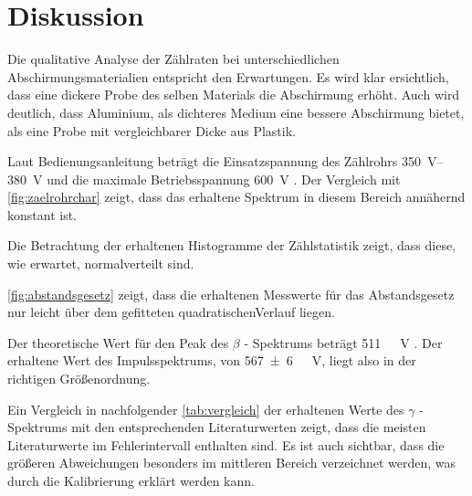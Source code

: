 \documentclass[12pt,english,ngerman]{scrartcl}
\begin{document}
\section*{Diskussion}\label{sec:diskussion}

Die qualitative Analyse der Zählraten bei unterschiedlichen Abschirmungsmaterialien entspricht den Erwartungen.
Es wird klar ersichtlich, dass eine dickere Probe des selben Materials die Abschirmung erhöht. Auch wird deutlich,
dass Aluminium, als dichteres Medium eine bessere Abschirmung bietet, als eine Probe mit vergleichbarer Dicke aus Plastik.

Laut Bedienungsanleitung beträgt die Einsatzspannung des Zählrohrs \SIrange{350}{380}{\volt} und die maximale Betriebsspannung
\SI{600}{\volt} \cite[]{}. Der Vergleich mit \autoref{fig:zaelrohrchar} zeigt, dass das erhaltene Spektrum in diesem Bereich
annähernd konstant ist.

Die Betrachtung der erhaltenen Histogramme der Zählstatistik zeigt, dass diese, wie erwartet, normalverteilt sind.

\autoref{fig:abstandsgesetz} zeigt, dass die erhaltenen Messwerte für das Abstandsgesetz nur leicht über dem gefitteten
 quadratischenVerlauf liegen.


Der theoretische Wert für den Peak des $\beta$ - Spektrums beträgt \SI{511}{\kilo\elekton\volt} \cite[]{leifi}. 
Der erhaltene Wert des Impulsspektrums, von \SI{567(6)}{\kilo\elekton\volt}, liegt also in der richtigen Größenordnung.

Ein Vergleich in nachfolgender \autoref{tab:vergleich} der erhaltenen Werte des $\gamma$ - Spektrums mit den 
entsprechenden Literaturwerten zeigt, dass die meisten Literaturwerte im Fehlerintervall enthalten sind.
Es ist auch sichtbar, dass die größeren Abweichungen besonders im mittleren Bereich verzeichnet werden, was durch 
die Kalibrierung erklärt werden kann.
\end{document}
